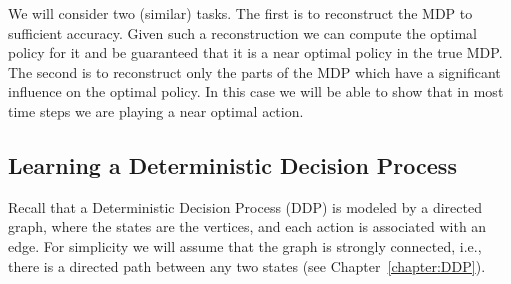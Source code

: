 We will consider two (similar) tasks. The first is to reconstruct
the MDP to sufficient accuracy. Given such a reconstruction we can
compute the optimal policy for it and be guaranteed that it is a
near optimal policy in the true MDP. The second is to reconstruct
only the parts of the MDP which have a significant influence on the
optimal policy. In this case we will be able to show that in most
time steps we are playing a near optimal action.

\subsection{Learning a Deterministic Decision Process}

Recall that a Deterministic Decision Process (DDP) is modeled by a
directed graph, where the states are the vertices, and each action
is associated with an edge. For simplicity we will assume that the
graph is strongly connected, i.e., there is a directed path between
any two states (see Chapter~\ref{chapter:DDP}).

%
%
%
%
%
%
%

